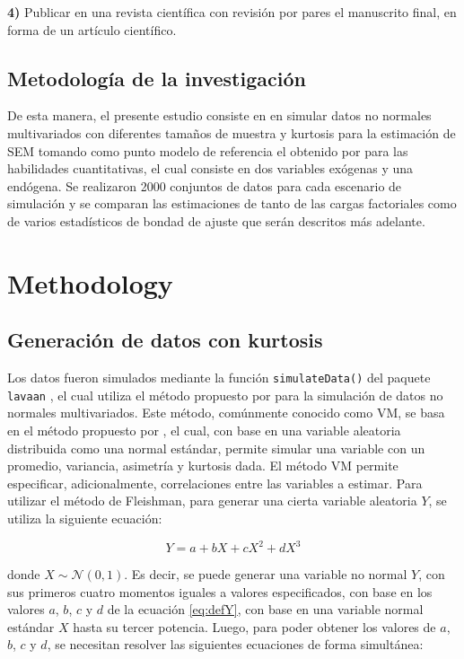 \documentclass[english]{revcoles}
\begin{document}
\textbf{4)} Publicar en una revista científica con revisión por pares el manuscrito final, en forma de un artículo científico.

\subsection{Metodología de la investigación}

De esta manera, el presente estudio consiste en en simular datos no normales multivariados con diferentes tamaños de muestra y kurtosis para la estimación de SEM tomando como punto modelo de referencia el obtenido por  para las habilidades cuantitativas, el cual consiste en dos variables exógenas y una endógena. Se realizaron 2000 conjuntos de datos para cada escenario de simulación y se comparan las estimaciones de tanto de las cargas factoriales como de varios estadísticos de bondad de ajuste que serán descritos más adelante.

\section{Methodology}

\subsection{Generación de datos con kurtosis}

Los datos fueron simulados mediante la función \texttt{simulateData()} del paquete \texttt{lavaan} \cite{lavaan}, el cual utiliza el método propuesto por  para la simulación de datos no normales multivariados. Este método, comúnmente conocido como VM, se basa en el método propuesto por , el cual, con base en una variable aleatoria distribuida como una normal estándar, permite simular una variable con un promedio, variancia, asimetría y kurtosis dada. El método VM permite especificar, adicionalmente, correlaciones entre las variables a estimar. Para utilizar el método de Fleishman, para generar una cierta variable aleatoria \(Y\), se utiliza la siguiente ecuación:

\begin{equation} \label{eq:defY}
  Y = a + bX + cX^2 + d X^3
\end{equation}

donde \(X \sim \mathcal{N} (0,1)\). Es decir, se puede generar una variable no normal \(Y\), con sus primeros cuatro momentos iguales a valores especificados, con base en los valores \(a\), \(b\), \(c\) y \(d\) de la ecuación \ref{eq:defY}, con base en una variable normal estándar \(X\) hasta su tercer potencia. Luego, para poder obtener los valores de \(a\), \(b\), \(c\) y \(d\), se necesitan resolver las siguientes ecuaciones de forma simultánea:
\end{document}
